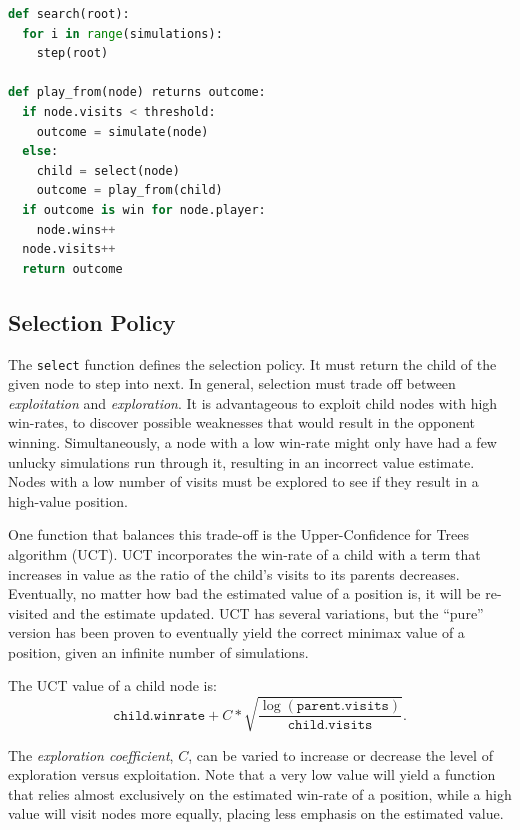 \documentclass[11pt]{report}
\begin{document}
\begin{lstlisting}[float,frame=single,language=Python,caption=MCTS Algorithm Pseudocode]
def search(root):
  for i in range(simulations):
    step(root)

def play_from(node) returns outcome:
  if node.visits < threshold:
    outcome = simulate(node)
  else:
    child = select(node)
    outcome = play_from(child)
  if outcome is win for node.player:
    node.wins++
  node.visits++
  return outcome
\end{lstlisting}

\subsection{Selection Policy}
The \texttt{select} function defines the selection policy. It must return the child of the given node to step into next. In general, selection must trade off between \emph{exploitation} and \emph{exploration}. It is advantageous to exploit child nodes with high win-rates, to discover possible weaknesses that would result in the opponent winning. Simultaneously, a node with a low win-rate might only have had a few unlucky simulations run through it, resulting in an incorrect value estimate. Nodes with a low number of visits must be explored to see if they result in a high-value position.

One function that balances this trade-off is the Upper-Confidence for Trees algorithm (UCT). UCT incorporates the win-rate of a child with a term that increases in value as the ratio of the child's visits to its parents decreases. Eventually, no matter how bad the estimated value of a position is, it will be re-visited and the estimate updated. UCT has several variations, but the ``pure'' version has been proven to eventually yield the correct minimax value of a position, given an infinite number of simulations\cite{gelly2006exploration}.

The UCT value of a child node is:
\[
	\texttt{child.winrate} + C*\sqrt{\frac{\log{(\texttt{parent.visits})}}{\texttt{child.visits}}}.
\]

The \emph{exploration coefficient}, $C$, can be varied to increase or decrease the level of exploration versus exploitation. Note that a very low value will yield a function that relies almost exclusively on the estimated win-rate of a position, while a high value will visit nodes more equally, placing less emphasis on the estimated value.
\end{document}
